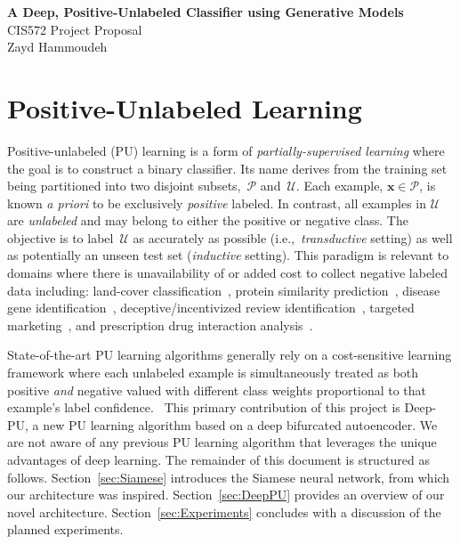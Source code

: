 \documentclass[10pt]{article}
\newcommand{\toolname}{Deep-PU}
\begin{document}
\suppressfloats%
\begin{center}
  \textbf{\Large \textbf{A Deep, Positive-Unlabeled Classifier using Generative Models}}
  \\\vspace{8pt}
  {\large CIS572 Project Proposal}
  \\\vspace{4pt}
  Zayd Hammoudeh
\end{center}

\section{Positive-Unlabeled Learning}

Positive-unlabeled (PU) learning is a form of \textit{partially-supervised learning}  where the goal is to construct a binary classifier. Its name derives from the training set being partitioned into two disjoint subsets,~$\mathcal{P}$ and~$\mathcal{U}$.  Each example, ${\mathbf{x} \in \mathcal{P}}$, is known \textit{a priori} to be exclusively \textit{positive} labeled. In contrast, all examples in $\mathcal{U}$ are \textit{unlabeled} and may belong to either the positive or negative class. The objective is to label~$\mathcal{U}$ as accurately as possible (i.e.,~\textit{transductive} setting) as well as potentially an unseen test set (\textit{inductive} setting).  This paradigm is relevant to domains where there is unavailability of or added cost to collect negative labeled data including: land-cover classification~\cite{Li:2011}, protein similarity prediction~\cite{Elkan:2008}, disease gene identification~\cite{Yang:2012}, deceptive/incentivized review identification~\cite{Ren:2014}, targeted marketing~\cite{Yi:2017}, and prescription drug interaction analysis~\cite{Liu:2017}.

State-of-the-art PU learning algorithms generally rely on a cost-sensitive learning framework where each unlabeled example is simultaneously treated as both positive \textit{and} negative valued with different class weights proportional to that example's label confidence.~\cite{Elkan:2008}  This primary contribution of this project is \toolname, a new PU learning algorithm based on a deep bifurcated autoencoder.  We are not aware of any previous PU learning algorithm that leverages the unique advantages of deep learning.    The remainder of this document is structured as follows.  Section~\ref{sec:Siamese} introduces the Siamese neural network, from which our architecture was inspired.  Section~\ref{sec:DeepPU} provides an overview of our novel architecture.  Section~\ref{sec:Experiments} concludes with a discussion of the planned experiments.
\end{document}
